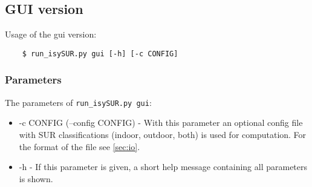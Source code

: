 \documentclass[11pt,fleqn]{book} %
\begin{document}
\subsection{GUI version}\label{sec:gui}
Usage of the gui version:
\begin{verbatim}
	$ run_isySUR.py gui [-h] [-c CONFIG]
\end{verbatim}

\subsubsection{Parameters}
The parameters of \texttt{run\_isySUR.py gui}:
\begin{itemize}
	\item -c CONFIG (--config CONFIG) - With this parameter an optional config file with SUR classifications (indoor, outdoor, both) is used for computation. For the format of the file see \ref{sec:io}.
	\item -h - If this parameter is given, a short help message containing all parameters is shown.
\end{itemize}
\end{document}
